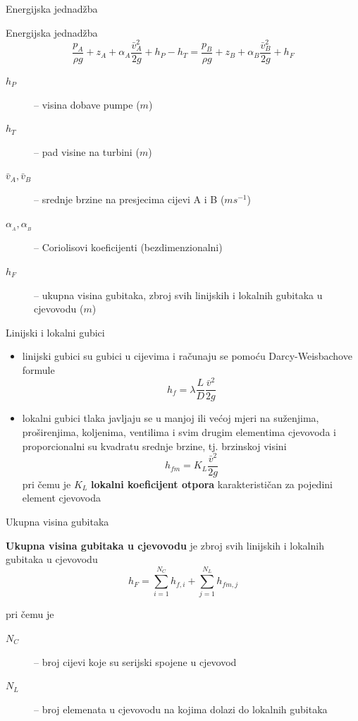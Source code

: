 \documentclass[croatian]{beamer}
\begin{document}
\begin{frame}{Energijska jednadžba}

\begin{alertblock}{Energijska jednadžba}
\[
\frac{p_{{\scriptscriptstyle A}}}{\rho g}+z_{{\scriptscriptstyle A}}+\alpha_{{\scriptscriptstyle A}}\frac{\bar{v}_{{\scriptscriptstyle A}}^{2}}{2g}+h_{P}-h_{T}=\frac{p_{{\scriptscriptstyle B}}}{\rho g}+z_{{\scriptscriptstyle B}}+\alpha_{{\scriptscriptstyle B}}\frac{\bar{v}_{{\scriptscriptstyle B}}^{2}}{2g}+h_{F}
\]
\end{alertblock}
\begin{description}
\item [{$h_{P}$}] -- visina dobave pumpe ($m$)
\item [{$h_{T}$}] -- pad visine na turbini ($m$)
\item [{$\bar{v}_{A},\bar{v}_{B}$}] -- srednje brzine na presjecima cijevi
A i B ($ms^{-1}$)
\item [{$\alpha_{_{A}},\alpha_{_{B}}$}] -- Coriolisovi koeficijenti (bezdimenzionalni)
\item [{$h_{F}$}] -- ukupna visina gubitaka, zbroj svih linijskih i lokalnih
gubitaka u cjevovodu ($m$)
\end{description}
\end{frame}

\begin{frame}{Linijski i lokalni gubici}

\begin{itemize}
\item \alert{linijski gubici} su gubici u cijevima i računaju se pomoću
Darcy-Weisbachove formule
\[
h_{f}=\lambda\frac{L}{D}\frac{\bar{v}^{2}}{2g}
\]
\item \alert{lokalni gubici} tlaka javljaju se u manjoj ili većoj mjeri
na suženjima, proširenjima, koljenima, ventilima i svim drugim elementima
cjevovoda i proporcionalni su kvadratu srednje brzine, tj. brzinskoj
visini 
\[
h_{fm}=K_{L}\frac{\bar{v}^{2}}{2g}
\]
pri čemu je $K_{L}$ \textbf{lokalni koeficijent otpora} karakterističan
za pojedini element cjevovoda
\end{itemize}
\end{frame}

\begin{frame}{Ukupna visina gubitaka}

\begin{block}{}
\textbf{Ukupna visina gubitaka u cjevovodu} je zbroj svih linijskih
i lokalnih gubitaka u cjevovodu
\[
h_{F}=\sum_{i=1}^{N_{C}}h_{f,i}+\sum_{j=1}^{N_{L}}h_{fm,j}
\]
\end{block}
pri čemu je
\begin{description}
\item [{$N_{C}$}] -- broj cijevi koje su serijski spojene u cjevovod
\item [{$N_{L}$}] -- broj elemenata u cjevovodu na kojima dolazi do lokalnih
gubitaka
\end{description}
\end{frame}
\end{document}
